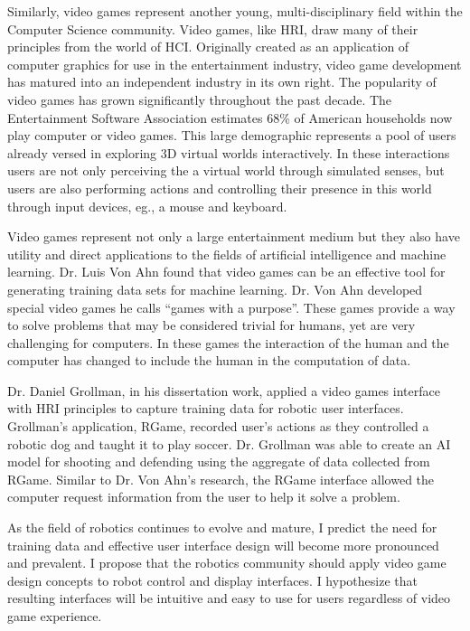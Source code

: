 Similarly, video games represent another young, multi-disciplinary field within the Computer Science community. Video games, like HRI, draw many of their principles from the world of HCI. Originally created as an application of computer graphics for use in the entertainment industry, video game development has matured into an independent industry in its own right. The popularity of video games has grown significantly throughout the past decade. The Entertainment Software Association estimates 68\% of American households now play computer or video games. \cite{ESA} This large demographic represents a pool of users already versed in exploring 3D virtual worlds interactively. In these interactions users are not only perceiving the a virtual world through simulated senses, but users are also performing actions and controlling their presence in this world through input devices, eg., a mouse and keyboard.

Video games represent not only a large entertainment medium but they also have utility and direct applications to the fields of artificial intelligence and machine learning. Dr. Luis Von Ahn found that video games can be an effective tool for generating training data sets for machine learning. \cite{GWAP} Dr. Von Ahn developed special video games he calls ``games with a purpose''.  These games provide a way to solve problems that may be considered trivial for humans, yet are very challenging for computers. In these games the interaction of the human and the computer has changed to include the human in the computation of data.

Dr. Daniel Grollman, in his dissertation work, applied a video games interface with HRI principles to capture training data for robotic user interfaces. \cite{Grollman} Grollman's application, RGame, recorded user’s actions as they controlled a robotic dog and taught it to play soccer. Dr. Grollman was able to create an AI model for shooting and defending using the aggregate of data collected from RGame. Similar to Dr. Von Ahn's research, the RGame interface allowed the computer request information from the user to help it solve a problem.

As the field of robotics continues to evolve and mature, I predict the need for training data and effective user interface design will become more pronounced and prevalent. I propose that the robotics community should apply video game design concepts to robot control and display interfaces. I hypothesize that resulting interfaces will be intuitive and easy to use for users regardless of video game experience.
